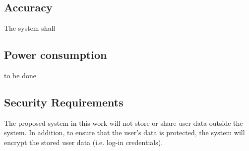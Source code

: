     \subsection{Accuracy}
    The system shall 
    
    \subsection{Power consumption}
    to be done 
    
    \subsection{Security Requirements}
    The proposed system in this work will not store or share user data outside the system. In addition, to ensure that the user's data is protected, the system will encrypt the stored user data (i.e. log-in credentials). 
    
    
    